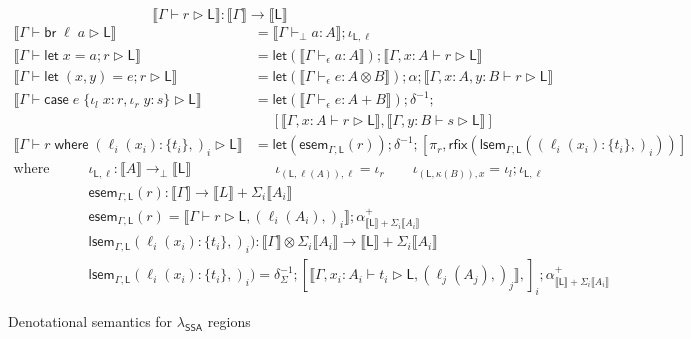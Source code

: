 \documentclass[acmsmall,screen,review]{acmart}
\newcommand{\ms}[1]{\ensuremath{\mathsf{#1}}}
\newcommand{\lto}{:}
\newcommand{\linl}[1]{\iota_l\;{#1}}
\newcommand{\linr}[1]{\iota_r\;{#1}}
\newcommand{\letstmt}[3]{\ensuremath{\ms{let}\;#1 = #2; #3}}
\newcommand{\brb}[2]{\ms{br}\;#1\;#2}
\newcommand{\casestmt}[5]{\ms{case}\;#1\;\{\linl{#2} \lto #3, \linr{#4} \lto #5\}}
\newcommand{\where}[2]{#1\;\ms{where}\;#2}
\newcommand{\wbranch}[3]{#1(#2) \lto \{#3\}}
\newcommand{\bhyp}[2]{#1 : #2}
\newcommand{\lhyp}[2]{#1(#2)}
\newcommand{\hasty}[4]{#1 \vdash_{#2} #3: {#4}}
\newcommand{\haslb}[3]{#1 \vdash #2 \rhd #3}
\newcommand{\dnt}[1]{\llbracket{#1}\rrbracket}
\newcommand{\entrymor}[3]{\ms{esem}_{#1, #3}(#2)}
\newcommand{\loopmor}[3]{\ms{lsem}_{#1, #3}(#2)}
\newcommand{\lmor}[1]{\ms{let}(#1)}
\newcommand{\rfix}[1]{\ms{rfix}(#1)}
\newcommand{\isotopessa}{\(\lambda_{\ms{SSA}}\)}
\begin{document}
\begin{figure}
  \begin{equation*}
    \boxed{\dnt{\haslb{\Gamma}{r}{\ms{L}}} : \dnt{\Gamma} \to \dnt{\ms{L}}}
  \end{equation*}
  \begin{align*}
    \dnt{\haslb{\Gamma}{\brb{\ell}{a}}{\ms{L}}} 
      &= \dnt{\hasty{\Gamma}{\bot}{a}{A}} ; \iota_{\ms{L}, \ell}
      \\
    \dnt{\haslb{\Gamma}{\letstmt{x}{a}{r}}{\ms{L}}}
      &= \lmor{\dnt{\hasty{\Gamma}{\epsilon}{a}{A}}}
      ; \dnt{\haslb{\Gamma, \bhyp{x}{A}}{r}{\ms{L}}} 
      \\
    \dnt{\haslb{\Gamma}{\letstmt{(x, y)}{e}{r}}{\ms{L}}}
      &= \lmor{\dnt{\hasty{\Gamma}{\epsilon}{e}{A \otimes B}}} ; \alpha
      ; \dnt{\haslb{\Gamma, \bhyp{x}{A}, \bhyp{y}{B}}{r}{\ms{L}}} 
      \\ 
    \dnt{\haslb{\Gamma}{\casestmt{e}{x}{r}{y}{s}}{\ms{L}}}
      &= \lmor{\dnt{\hasty{\Gamma}{\epsilon}{e}{A + B}}}
      ; \delta^{-1} ;
      \\&\quad\;
      [
        \dnt{\haslb{\Gamma, \bhyp{x}{A}}{r}{\ms{L}}},
        \dnt{\haslb{\Gamma, \bhyp{y}{B}}{s}{\ms{L}}}
      ]
      \\
    \dnt{\haslb{\Gamma}{\where{r}{(\wbranch{\ell_i}{x_i}{t_i},)_i}}{\ms{L}}}
      &= \lmor{\entrymor{\Gamma}{r}{\ms{L}}} 
      ; \delta^{-1} 
      ; [\pi_r, \rfix{\loopmor{\Gamma}{(\wbranch{\ell_i}{x_i}{t_i},)_i}{\ms{L}}} ]
  \end{align*} 
  \begin{align*}
    \text{where} \qquad 
    & \boxed{\iota_{\ms{L}, \ell} : \dnt{A} \to_\bot \dnt{\ms{L}}} \qquad \qquad \qquad
    \iota_{(\ms{L}, \ell(A)), \ell} = \iota_r \qquad
    \iota_{(\ms{L}, \kappa(B)), x} = \iota_l ; \iota_{\ms{L}, \ell} \\
    & \boxed{\entrymor{\Gamma}{r}{\ms{L}} : \dnt{\Gamma} \to \dnt{L} + \Sigma_i\dnt{A_i}} \\
    & \entrymor{\Gamma}{r}{\ms{L}} = \dnt{\haslb{\Gamma}{r}{\ms{L}, (\lhyp{\ell_i}{A_i},)_i}} 
    ; \alpha^+_{\dnt{\ms{L}} + \Sigma_i \dnt{A_i}} \\
    & \boxed{\loopmor{\Gamma}{\wbranch{\ell_i}{x_i}{t_i},)_i}{\ms{L}} 
      : \dnt{\Gamma} \otimes \Sigma_i\dnt{A_i} \to \dnt{\ms{L}} + \Sigma_i\dnt{A_i}}
    \\
    & \loopmor{\Gamma}{\wbranch{\ell_i}{x_i}{t_i},)_i}{\ms{L}} = \delta^{-1}_{\Sigma} 
      ; [ \dnt{\haslb{\Gamma, \bhyp{x_i}{A_i}}{t_i}{\ms{L}, (\lhyp{\ell_j}{A_j},)_j}}, ]_i
      ; \alpha^+_{\dnt{\ms{L}} + \Sigma_i \dnt{A_i}}  
  \end{align*}
  \caption{Denotational semantics for \isotopessa{} regions}
  \label{fig:ssa-reg-sem}
\end{figure}
\end{document}
